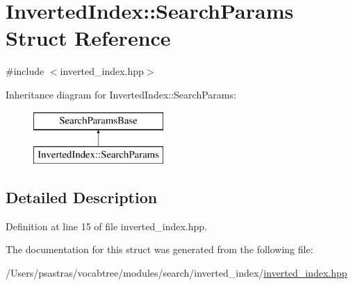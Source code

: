 \hypertarget{structInvertedIndex_1_1SearchParams}{\section{Inverted\-Index\-:\-:Search\-Params Struct Reference}
\label{structInvertedIndex_1_1SearchParams}
}


{\ttfamily \#include $<$inverted\-\_\-index.\-hpp$>$}

Inheritance diagram for Inverted\-Index\-:\-:Search\-Params\-:\begin{figure}[H]
\begin{center}
\leavevmode
\includegraphics[height=2.000000cm]{structInvertedIndex_1_1SearchParams}
\end{center}
\end{figure}


\subsection{Detailed Description}


Definition at line 15 of file inverted\-\_\-index.\-hpp.



The documentation for this struct was generated from the following file\-:\begin{DoxyCompactItemize}
\item 
/\-Users/psastras/vocabtree/modules/search/inverted\-\_\-index/\hyperlink{inverted__index_8hpp}{inverted\-\_\-index.\-hpp}\end{DoxyCompactItemize}
